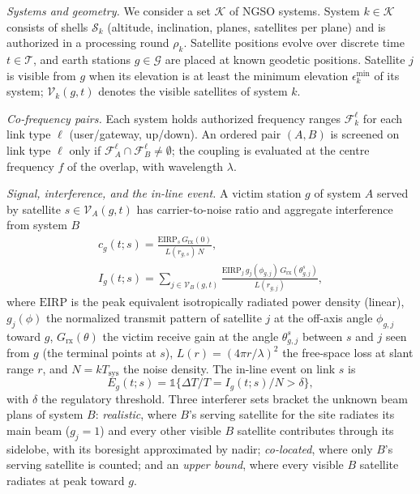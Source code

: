 \documentclass[conference]{IEEEtran}
\begin{document}
\emph{Systems and geometry.} We consider a set $\mathcal{K}$ of NGSO systems.
System $k \in \mathcal{K}$ consists of shells $\mathcal{S}_k$ (altitude,
inclination, planes, satellites per plane) and is authorized in a processing
round $\rho_k$. Satellite positions evolve over discrete time
$t \in \mathcal{T}$, and earth stations $g \in \mathcal{G}$ are placed at known
geodetic positions. Satellite $j$ is visible from $g$ when its elevation is at
least the minimum elevation $\epsilon_k^{\min}$ of its system;
$\mathcal{V}_{k}(g,t)$ denotes the visible satellites of system $k$.

\emph{Co-frequency pairs.} Each system holds authorized frequency ranges
$\mathcal{F}_k^{\ell}$ for each link type $\ell$ (user/gateway, up/down). An
ordered pair $(A,B)$ is screened on link type $\ell$ only if
$\mathcal{F}_A^{\ell} \cap \mathcal{F}_B^{\ell} \neq \emptyset$; the coupling is
evaluated at the centre frequency $f$ of the overlap, with wavelength $\lambda$.

\emph{Signal, interference, and the in-line event.} A victim station $g$ of
system $A$ served by satellite $s \in \mathcal{V}_A(g,t)$ has carrier-to-noise
ratio and aggregate interference from system $B$
\begin{gather}
c_g(t;s) = \frac{\mathrm{EIRP}_s\, G_{\text{rx}}(0)}{L(r_{g,s})\,N}, \label{eq:cn}\\
I_g(t;s) = \sum_{j \in \mathcal{V}_B(g,t)} \frac{\mathrm{EIRP}_j\,
g_j(\phi_{g,j})\, G_{\text{rx}}(\theta_{g,j}^{s})}{L(r_{g,j})},
\label{eq:agg}
\end{gather}
where $\mathrm{EIRP}$ is the peak equivalent isotropically radiated power density
(linear), $g_j(\phi)$ the normalized transmit pattern of satellite $j$ at the
off-axis angle $\phi_{g,j}$ toward $g$, $G_{\text{rx}}(\theta)$ the victim
receive gain at the angle $\theta_{g,j}^{s}$ between $s$ and $j$ seen from $g$
(the terminal points at $s$), $L(r)=(4\pi r/\lambda)^2$ the free-space loss at
slant range $r$, and $N = kT_{\text{sys}}$ the noise density. The in-line event
on link $s$ is
\begin{equation}
E_g(t;s) = \mathbb{1}\{\Delta T/T = I_g(t;s)/N > \delta\},
\label{eq:event}
\end{equation}
with $\delta$ the regulatory threshold. Three interferer sets bracket the unknown
beam plans of system $B$: \emph{realistic}, where $B$'s serving satellite for the
site radiates its main beam ($g_j = 1$) and every other visible $B$ satellite
contributes through its sidelobe, with its boresight approximated by nadir;
\emph{co-located}, where only $B$'s serving satellite is counted; and an
\emph{upper bound}, where every visible $B$ satellite radiates at peak toward $g$.
\end{document}
